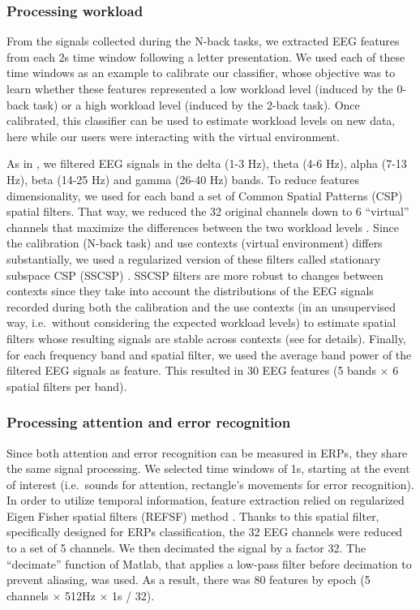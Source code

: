 \documentclass[]{sigchi}
\begin{document}
\subsubsection{Processing workload}\label{processing-workload}

From the signals collected during the N-back tasks, we extracted EEG
features from each 2s time window following a letter presentation. We
used each of these time windows as an example to calibrate our
classifier, whose objective was to learn whether these features
represented a low workload level (induced by the 0-back task) or a high
workload level (induced by the 2-back task). Once calibrated, this
classifier can be used to estimate workload levels on new data, here
while our users were interacting with the virtual environment.

As in \citep{Wobrock2015}, we filtered EEG signals in the delta (1-3
Hz), theta (4-6 Hz), alpha (7-13 Hz), beta (14-25 Hz) and gamma (26-40
Hz) bands. To reduce features dimensionality, we used for each band a
set of Common Spatial Patterns (CSP) spatial filters. That way, we
reduced the 32 original channels down to 6 ``virtual'' channels that
maximize the differences between the two workload levels
\citep{Ramoser2000}. Since the calibration (N-back task) and use
contexts (virtual environment) differs substantially, we used a
regularized version of these filters called stationary subspace CSP
(SSCSP) \citep{Wobrock2015}. SSCSP filters are more robust to changes
between contexts since they take into account the distributions of the
EEG signals recorded during both the calibration and the use contexts
(in an unsupervised way, i.e.~without considering the expected workload
levels) to estimate spatial filters whose resulting signals are stable
across contexts (see \citep{Wobrock2015} for details). Finally, for each
frequency band and spatial filter, we used the average band power of the
filtered EEG signals as feature. This resulted in 30 EEG features (5
bands $\times$ 6 spatial filters per band).

\subsubsection{Processing attention and error
recognition}\label{processing-attention-and-error-recognition}

Since both attention and error recognition can be measured in ERPs, they
share the same signal processing. We selected time windows of 1s,
starting at the event of interest (i.e.~sounds for attention,
rectangle's movements for error recognition). In order to utilize
temporal information, feature extraction relied on regularized Eigen
Fisher spatial filters (REFSF) method \citep{Hoffmann2006}. Thanks to
this spatial filter, specifically designed for ERPs classification, the
32 EEG channels were reduced to a set of 5 channels. We then decimated
the signal by a factor 32. The ``decimate'' function of Matlab, that
applies a low-pass filter before decimation to prevent aliasing, was
used. As a result, there was 80 features by epoch (5 channels $\times$
512Hz $\times$ 1s / 32).
\end{document}
